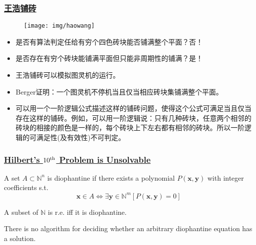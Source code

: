 \documentclass[UTF8,aspectratio=43,11pt,colorlinks,compress,openany]{beamer}%
\begin{document}
\begin{frame}\frametitle{\href{https://arxiv.org/abs/1506.06492}{王浩铺砖}}
	\begin{figure}
		\texttt{[image: img/haowang]}%
	\end{figure}
\begin{itemize}
	\item 是否有算法判定任给有穷个四色砖块能否铺满整个平面？否！
	\item 是否存在有穷个砖块能铺满平面但只能非周期性的铺满？是！
	\item 王浩铺砖可以模拟图灵机的运行。
	\item Berger证明：一个图灵机不停机当且仅当相应砖块集铺满整个平面。
	\item 可以用一个一阶逻辑公式描述这样的铺砖问题，使得这个公式可满足当且仅当存在这样的铺砖。例如，可以用一阶逻辑说：只有几种砖块，任意两个相邻的砖块的相接的颜色是一样的，每个砖块上下左右都有相邻的砖块。所以一阶逻辑的可满足性(及有效性)不可判定。
\end{itemize}
\end{frame}

\begin{frame}\frametitle{\href{http://120.52.51.18/www.math.umd.edu/~laskow/Pubs/713/Diophantine.pdf}{Hilbert's $10\textsuperscript{th}$ Problem is Unsolvable}}
	\setlength\abovedisplayskip{0pt}
	\setlength\belowdisplayskip{0pt}
	\begin{definition}
		A set $A\subset\mathbb{N}^n$ is diophantine if there exists a polynomial $P(\mathbf{x},\mathbf{y})$ with integer coefficients s.t.
		\[\mathbf{x}\in A\iff\exists \mathbf{y}\in\mathbb{N}^m [P(\mathbf{x},\mathbf{y})=0]\]
	\end{definition}
	\begin{theorem}
	A subset of $\mathbb{N}$ is r.e. iff it is diophantine.
	\end{theorem}
	\begin{block}{}
	There is no algorithm for deciding whether an arbitrary diophantine equation has a solution.
	\end{block}\vspace{-1ex}
		\begin{figure}[H]
		\end{figure}
\end{frame}
\end{document}
